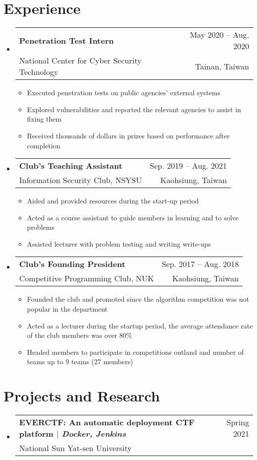 \documentclass[A4,11pt]{article}
\makeatletter
\newcommand{\CVItem}[1]{
  \item\small{
    {#1 \vspace{-2pt}}
  }
}
\newcommand{\CVSubheading}[4]{
  \vspace{-2pt}\item
    \begin{tabular*}{0.97\textwidth}[t]{l@{\extracolsep{\fill}}r}
      \textbf{#1} & #2 \\
      \small#3 & \small #4 \\
    \end{tabular*}\vspace{-7pt}
}
\newcommand{\CVSubHeadingListStart}{\begin{itemize}[leftmargin=0.5cm, label={}]}
\newcommand{\CVSubHeadingListEnd}{\end{itemize}}
\newcommand{\CVItemListStart}{\begin{itemize}}
\newcommand{\CVItemListEnd}{\end{itemize}\vspace{-5pt}}
\makeatother
\begin{document}
  \section{Experience}
    \CVSubHeadingListStart
      \CVSubheading
        {Penetration Test Intern}{May 2020 -- Aug. 2020}
        {National Center for Cyber Security Technology}{Tainan, Taiwan}
        \CVItemListStart
          \CVItem{Executed penetration tests on public agencies' external systems}
          \CVItem{Explored vulnerabilities and reported the relevant agencies to assist in fixing them}
          \CVItem{Received thousands of dollars in prizes based on performance after completion }
        \CVItemListEnd
      \CVSubheading
        {Club's Teaching Assistant}{Sep. 2019 -- Aug. 2021}
        {Information Security Club, NSYSU}{Kaohsiung, Taiwan}
        \CVItemListStart
          \CVItem{Aided and provided resources during the start-up period}
          \CVItem{Acted as a course assistant to guide members in learning and to solve problems}
          \CVItem{Assisted lecturer with problem testing and writing write-ups}
        \CVItemListEnd
      \CVSubheading
        {Club's Founding President}{Sep. 2017 -- Aug. 2018}
        {Competitive Programming Club, NUK}{Kaohsiung, Taiwan}
        \CVItemListStart
          \CVItem{Founded the club and promoted since the algorithm competition was not popular in the department}
          \CVItem{Acted as a lecturer during the startup period, the average attendance rate of the club members was over 80\%}
          \CVItem{Headed members to participate in competitions outland and number of teams up to 9 teams (27 members)}
        \CVItemListEnd
    \CVSubHeadingListEnd

\begin{comment}
  Ideally the title of the work should speak for what it is. However if you feel
  like you should explain more about why the project is applicable to this job,
  use item list as is shown in the work experience section.
  \end{comment}
  
  \section{Projects and Research}
    \CVSubHeadingListStart
      \CVSubheading
        {EVERCTF: An automatic deployment CTF platform $|$ \emph{\small{Docker, Jenkins}}}{Spring 2021}
        {National Sun Yat-sen University}{}
    \CVSubHeadingListEnd
\end{document}
